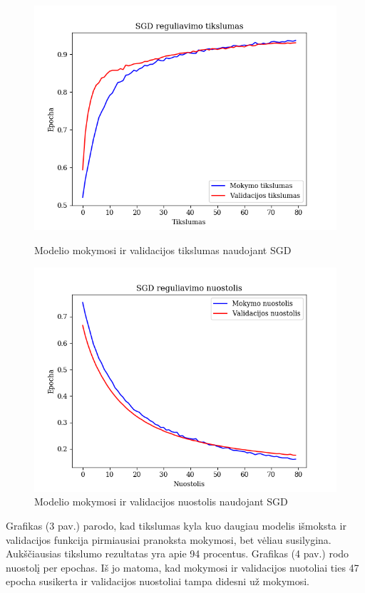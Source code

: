 \documentclass{VUMIFPSkursinis}
\begin{document}
\begin{figure}[!htbp]
  \centering
  \begin{minipage}[b]{0.49\textwidth}
    \includegraphics[width=\textwidth]{img/FT/SGD_acc.png}
    \caption{Modelio mokymosi ir validacijos tikslumas naudojant SGD}
  \end{minipage}
  \begin{minipage}[b]{0.49\textwidth}
    \includegraphics[width=\textwidth]{img/FT/SGD_loss.png}
    \caption{Modelio mokymosi ir validacijos nuostolis naudojant SGD}
  \end{minipage}
\end{figure}

Grafikas (3 pav.) parodo, kad tikslumas kyla kuo daugiau modelis išmoksta ir validacijos funkcija pirmiausiai pranoksta mokymosi, bet vėliau susilygina. Aukščiausias tikslumo rezultatas yra apie 94 procentus.
Grafikas (4 pav.) rodo nuostolį per epochas. Iš jo matoma, kad mokymosi ir validacijos nuotoliai ties 47 epocha susikerta ir validacijos nuostoliai tampa didesni už mokymosi.
\end{document}
